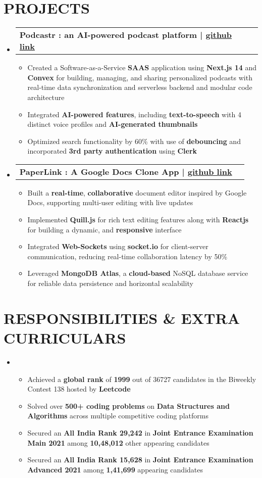 \documentclass[letterpaper,11pt]{article}
\makeatletter
\newcommand{\cvitem}[1]{
  \item\small{
    {#1\vspace{-2pt}}
  }
}
\newcommand{\cvHeading}[4]{
  \vspace{-2pt}\item
  \begin{tabular*}{\textwidth}[t]{l@{\extracolsep{\fill}}r}
    \textbf{#1} & #2 \\
  \end{tabular*}\vspace{-5pt}
}
\newcommand{\cvHeadingStart}{\begin{itemize}[leftmargin=0in, label={}]}
\newcommand{\cvHeadingEnd}{\end{itemize}}
\newcommand{\cvItemStart}{\begin{itemize}[label=\textbullet]\justifying}
\newcommand{\cvItemEnd}{\end{itemize}\vspace{-8pt}}
\makeatother
\begin{document}
\section{\textbf{PROJECTS}}
\cvHeadingStart
  \cvHeading
    {Podcastr : an AI-powered podcast platform | \href{https://github.com/zekkrron/Podcastr}{github link}}{}{}{}
  \cvItemStart
    \cvitem{Created a Software-as-a-Service \textbf{SAAS} application using \textbf{Next.js 14} and \textbf{Convex} for building, managing, and sharing personalized podcasts with real-time data synchronization and serverless backend and modular code architecture}
    \cvitem{Integrated \textbf{AI-powered features}, including \textbf{text-to-speech} with 4 distinct voice profiles and \textbf{AI-generated thumbnails}}
    \cvitem{Optimized search functionality by 60\% with use of \textbf{debouncing} and incorporated \textbf{3rd party authentication} using \textbf{Clerk}}
  \cvItemEnd

  \cvHeading
    {PaperLink : A Google Docs Clone App | \href{https://github.com/zekkrron/PaperLink}{github link}}{}{}{}
  \cvItemStart
    \cvitem{Built a \textbf{real-time}, \textbf{collaborative} document editor inspired by Google Docs, supporting multi-user editing with live updates}
    \cvitem{Implemented \textbf{Quill.js} for rich text editing features along with \textbf{Reactjs} for building a dynamic, and \textbf{responsive} interface}
    \cvitem{Integrated \textbf{Web-Sockets} using \textbf{socket.io} for client-server communication, reducing real-time collaboration latency by 50\%}
    \cvitem{Leveraged \textbf{MongoDB Atlas}, a \textbf{cloud-based} NoSQL database service for reliable data persistence and horizontal scalability}
  \cvItemEnd
\cvHeadingEnd

\section{\textbf{RESPONSIBILITIES \& EXTRA CURRICULARS}}
\cvHeadingStart
  \item
  \cvItemStart
    \cvitem{Achieved a \textbf{global rank} of \textbf{1999} out of 36727 candidates in the Biweekly Contest 138 hosted by \textbf{Leetcode}}
    \cvitem{Solved over \textbf{500+ coding problems} on \textbf{Data Structures and Algorithms} across multiple competitive coding platforms}
    \cvitem{Secured an \textbf{All India Rank 29,242} in \textbf{Joint Entrance Examination Main 2021} among \textbf{10,48,012} other appearing candidates}
    \cvitem{Secured an \textbf{All India Rank 15,628} in \textbf{Joint Entrance Examination Advanced 2021} among \textbf{1,41,699} appearing candidates}
  \cvItemEnd
\cvHeadingEnd
\end{document}
